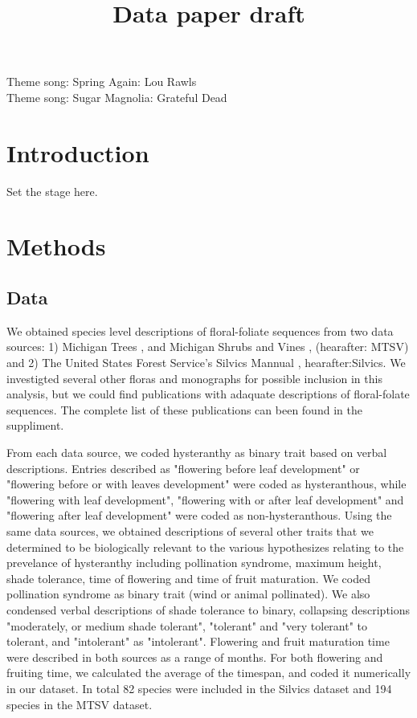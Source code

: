 \documentclass{article}\usepackage[]{graphicx}\usepackage[]{color}
\begin{document}
\title{Data paper draft}
Theme song: Spring Again: Lou Rawls\\
Theme song: Sugar Magnolia: Grateful Dead\\
\section*{Introduction}
Set the stage here.
\section*{Methods}
\subsection*{Data}
We obtained species level descriptions of floral-foliate sequences from two data sources: 1) Michigan Trees \citep{Barnes}, and Michigan Shrubs and Vines \citep{Barnes}, (hearafter: MTSV) and 2) The United States Forest Service's Silvics Mannual \citep{}, hearafter:Silvics. We investigted several other floras and monographs for possible inclusion in this analysis, but we could find publications with adaquate descriptions of floral-folate sequences. The complete list of these publications can been found in the suppliment.
\par From each data source, we coded hysteranthy as binary trait based on verbal descriptions. Entries described as "flowering before leaf development" or "flowering before or with leaves development" were coded as hysteranthous, while "flowering with leaf development", "flowering with or after leaf development" and "flowering after leaf development" were coded as non-hysteranthous. Using the same data sources, we obtained descriptions of several other traits that we determined to be biologically relevant to the various hypothesizes relating to the prevelance of hysteranthy including pollination syndrome, maximum height, shade tolerance, time of flowering and time of fruit maturation. We coded pollination syndrome as binary trait (wind or animal pollinated). We also condensed verbal descriptions of shade tolerance to binary, collapsing descriptions "moderately, or medium shade tolerant", "tolerant" and "very tolerant" to tolerant, and  "intolerant" as "intolerant". Flowering and fruit maturation time were described in both sources as a range of months. For both flowering and fruiting time, we calculated the average of the timespan, and coded it numerically in our dataset.  In total 82 species were included in the Silvics dataset and 194 species in the MTSV dataset.
\end{document}
